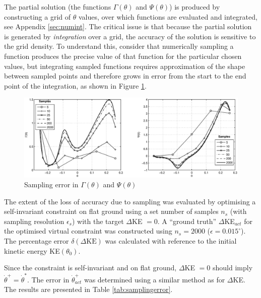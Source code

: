 The partial solution (the functions $\Gamma(\theta)$ and $\Psi(\theta)$) is produced by constructing a grid of $\theta$ values, over which functions are evaluated and integrated, see Appendix \ref{sec:numint}. The critical issue is that because the partial solution is generated by \textit{integration} over a grid, the accuracy of the solution is sensitive to the grid density. To understand this, consider that numerically sampling a function produces the precise value of that function for the particular chosen values, but integrating sampled functions requires approximation of the shape between sampled points and therefore grows in error from the start to the end point of the integration, as shown in Figure \ref{fig:samplingerror}.

\begin{figure}
	\centering
	\includegraphics[width=\linewidth]{4VirtConstLib/samplingerror.eps}
	\caption{Sampling error in $\Gamma(\theta)$ and $\Psi(\theta)$}
	\label{fig:samplingerror}
\end{figure}

The extent of the loss of accuracy due to sampling was evaluated by optimising a self-invariant constraint on flat ground using a set number of samples $n_s$ (with sampling resolution $\epsilon_s$) with the target $\Delta$KE $=0$. A  ``ground truth'' $\Delta$KE$_{act}$ for the optimised virtual constraint was constructed using $n_s=2000$ ($\epsilon = 0.015^\circ$). The percentage error $\delta(\Delta\mathrm{KE})$ was calculated with reference to the initial kinetic energy KE$(\theta_0)$.

Since the constraint is self-invariant and on flat ground, $\Delta$KE $=0$ should imply $\dot{\theta}^+=\dot{\theta}^*$. The error in $\dot{\theta}^+_{act}$ was determined using a similar method as for $\Delta$KE. The results are presented in Table \ref{tab:samplingerror}.

